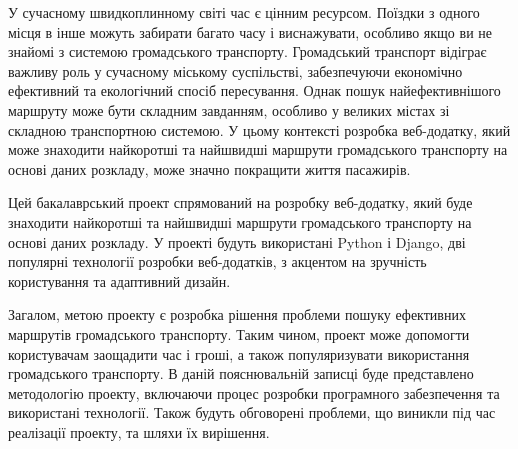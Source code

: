 \intro

У сучасному швидкоплинному світі час є цінним ресурсом. Поїздки з одного місця в інше можуть забирати багато часу і виснажувати, особливо якщо ви не знайомі з системою громадського транспорту. Громадський транспорт відіграє важливу роль у сучасному міському суспільстві, забезпечуючи економічно ефективний та екологічний спосіб пересування. Однак пошук найефективнішого маршруту може бути складним завданням, особливо у великих містах зі складною транспортною системою. У цьому контексті розробка веб-додатку, який може знаходити найкоротші та найшвидші маршрути громадського транспорту на основі даних розкладу, може значно покращити життя пасажирів.


Цей бакалаврський проект спрямований на розробку веб-додатку, який буде знаходити найкоротші та найшвидші маршрути громадського транспорту на основі даних розкладу. У проекті будуть використані Python і Django, дві популярні технології розробки веб-додатків, з акцентом на зручність користування та адаптивний дизайн.

Загалом, метою проекту є розробка рішення проблеми пошуку ефективних маршрутів громадського транспорту. Таким чином, проект може допомогти користувачам заощадити час і гроші, а також популяризувати використання громадського транспорту. В даній пояснювальній записці буде представлено методологію проекту, включаючи процес розробки програмного забезпечення та використані технології. Також будуть обговорені проблеми, що виникли під час реалізації проекту, та шляхи їх вирішення.
